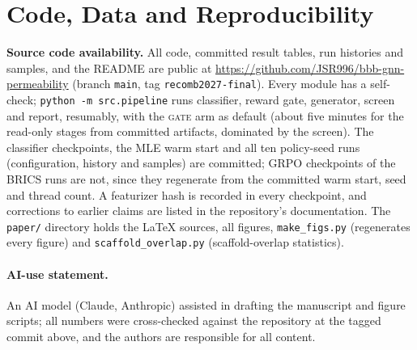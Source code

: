 \documentclass[10pt,letterpaper]{article}
\newcommand{\REPO}{\url{https://github.com/JSR996/bbb-gnn-permeability}}
\begin{document}
\section{Code, Data and Reproducibility}
\textbf{Source code availability.} All code, committed result tables, run histories and samples, and the README are public at \REPO{} (branch \texttt{main}, tag \texttt{recomb2027-final}). Every module has a self-check; \texttt{python -m src.pipeline} runs classifier, reward gate, generator, screen and report, resumably, with the \textsc{gate} arm as default (about five minutes for the read-only stages from committed artifacts, dominated by the screen). The classifier checkpoints, the MLE warm start and all ten policy-seed runs (configuration, history and samples) are committed; GRPO checkpoints of the BRICS runs are not, since they regenerate from the committed warm start, seed and thread count. A featurizer hash is recorded in every checkpoint, and corrections to earlier claims are listed in the repository's documentation. The \texttt{paper/} directory holds the \LaTeX{} sources, all figures, \texttt{make\_figs.py} (regenerates every figure) and \texttt{scaffold\_overlap.py} (scaffold-overlap statistics).

\paragraph{AI-use statement.} An AI model (Claude, Anthropic) assisted in drafting the manuscript and figure scripts; all numbers were cross-checked against the repository at the tagged commit above, and the authors are responsible for all content.
\end{document}
